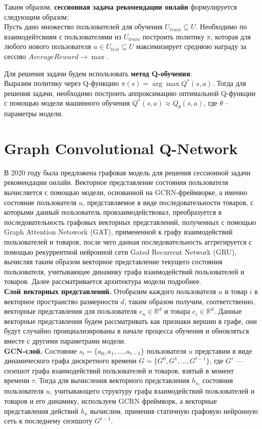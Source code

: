 \documentclass{mipt-thesis-ms}
\begin{document}
Таким образом, {\bf сессионная задача рекомендации онлайн} формулируется следующим образом:\\
Пусть дано множество пользователей для обучения $U_{train} \subseteq U$. Необходимо по взаимодейтсвиям с пользователями из $U_{train}$ построить политику $\pi$, которая для любого нового пользователя $u \in U_{test} \subseteq U$ максимизирует среднюю награду за сессию $AverageReward \rightarrow \max$.

Для решения задачи будем использовать {\bf метод Q-обучения}: \\Выразим политику через Q-функцию $\pi(s) = \arg \max Q^*(s, a)$. Тогда для решения задачи, необходимо построить аппроксимацию оптимальной Q-функции с помощью модели машинного обучения $Q^*(s, a) \approx Q_{\theta}(s, a)$, где $\theta$ -- параметры модели.


\section{Graph Convolutional Q-Network}
В 2020 году была предложена графовая модель для решения сессионной задачи рекомендации онлайн. Векторное представление состояния пользователя вычисляется с помощью модели, основанной на GCRN-фреймворке, а именно состояние пользователя $u$, представляемое в виде последовательности товаров, с которыми данный пользователь провзаимодействовал, преобразуется в последовательность графовых векторных представлений, полученных с помощью Graph Attention Netowork (GAT), примененной к графу взаимодействий пользователей и товаров, после чего данная последовательность аггрегируется с помощью рекуррентной нейронной сети Gated Recurrent Network (GRU), вычисляя таким образом векторное представление текущего состояния пользователя, учитывающее динамику графа взаимодействий пользователей и товаров. Далее рассматривается архитектура модели подробнее.
\\

{\bf Слой векторных представлений.} Отобразим каждого пользователя $u$ и товар $i$ в векторное пространство размерности $d$, таким образом получим, соответственно, векторные представления для пользователя $e_u \in \mathbb{R}^d$ и товара $e_i \in \mathbb{R}^d$. Данные векторные представления будем рассматривать как признаки вершин в графе, они будут случайно проициализированы в начале процесса обучения и обновляться вместе с другими параметрами модели.\\

{\bf GCN-слой.} Состояние $s_t = \{a_0, a_1, \dots, a_{t-1}\}$ пользователя $u$ представим в виде динамического графа дискретного времени $G = \{G^0, G^1, \dots, G^{t-1}\}$, где $G^{\tau}$ --- снэпшот графа взаимодействий пользователей и товаров, взятый в момент времени $\tau$. Тогда для вычисления векторного представления $h_{s_t}$ состояния пользователя $u$, учитывающего структуру графа взаимодействий пользователей и товаров и его динамику, используем GCRN фреймворк, а векторные представления действий $h_a$ вычислим, применив статичную графовую нейронную сеть к последнему снэпшоту $G^{t-1}$.\\
\end{document}
